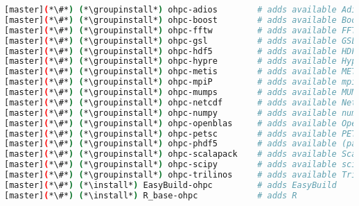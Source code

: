 \begin{lstlisting}[language=bash,keywords={},upquote=true,keepspaces]
[master](*\#*) (*\groupinstall*) ohpc-adios        # adds available Adios packages
[master](*\#*) (*\groupinstall*) ohpc-boost        # adds available Boost packages
[master](*\#*) (*\groupinstall*) ohpc-fftw         # adds available FFTW packages
[master](*\#*) (*\groupinstall*) ohpc-gsl          # adds available GSL packages
[master](*\#*) (*\groupinstall*) ohpc-hdf5         # adds available HDF5 packages
[master](*\#*) (*\groupinstall*) ohpc-hypre        # adds available Hypre packages
[master](*\#*) (*\groupinstall*) ohpc-metis        # adds available METIS packages
[master](*\#*) (*\groupinstall*) ohpc-mpiP         # adds available mpiP packages
[master](*\#*) (*\groupinstall*) ohpc-mumps        # adds available MUMPS packages
[master](*\#*) (*\groupinstall*) ohpc-netcdf       # adds available NetCDF packages
[master](*\#*) (*\groupinstall*) ohpc-numpy        # adds available numerical Python packages
[master](*\#*) (*\groupinstall*) ohpc-openblas     # adds available OpenBLAS packages
[master](*\#*) (*\groupinstall*) ohpc-petsc        # adds available PETSC packages
[master](*\#*) (*\groupinstall*) ohpc-phdf5        # adds available (parallel) HDF5 packages
[master](*\#*) (*\groupinstall*) ohpc-scalapack    # adds available ScaLAPACK packages
[master](*\#*) (*\groupinstall*) ohpc-scipy        # adds available scientific Python packages
[master](*\#*) (*\groupinstall*) ohpc-trilinos     # adds available Trilinos packages
[master](*\#*) (*\install*) EasyBuild-ohpc         # adds EasyBuild
[master](*\#*) (*\install*) R_base-ohpc            # adds R
\end{lstlisting}
